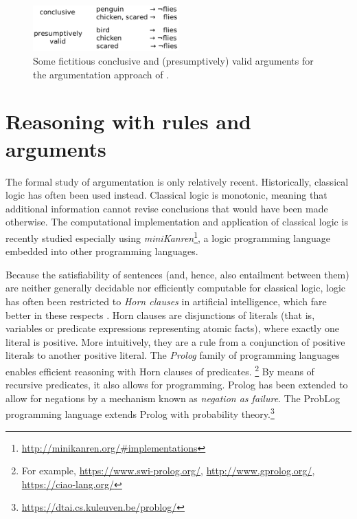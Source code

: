 \begin{figure}[htb]
        \centering
        \includegraphics[width=0.5\textwidth]{images/arguments.png}
        \caption{Some fictitious conclusive and (presumptively) valid arguments for the argumentation approach of \cite{verheijProofProbabilities2017}.}
        \label{fig:arguments}
\end{figure}


\section{Reasoning with rules and arguments}

The formal study of argumentation is only relatively recent. Historically, classical logic has often been used instead. Classical logic is monotonic, meaning that additional information cannot revise conclusions that would have been made otherwise. The computational implementation and application of classical logic is recently studied especially using \textit{miniKanren}\footnote{\url{http://minikanren.org/\#implementations}}, a logic programming language embedded into other programming languages.

Because the satisfiability of sentences (and, hence, also entailment between them) are neither generally decidable nor efficiently computable for classical logic, logic has often been restricted to \textit{Horn clauses} in artificial intelligence, which fare better in these respects \citep[ch.~7.5.3]{russellArtificialIntelligenceModern2010}. Horn clauses are disjunctions of literals (that is, variables or predicate expressions representing atomic facts), where exactly one literal is positive. More intuitively, they are a rule from a conjunction of positive literals to another positive literal. The \textit{Prolog} family of programming languages enables efficient reasoning with Horn clauses of predicates. \footnote{For example, \url{https://www.swi-prolog.org/}, \url{http://www.gprolog.org/}, \url{https://ciao-lang.org/}} By means of recursive predicates, it also allows for programming. Prolog has been extended to allow for negations by a mechanism known as \textit{negation as failure}. The ProbLog programming language extends Prolog with probability theory.\footnote{\url{https://dtai.cs.kuleuven.be/problog/}} 

